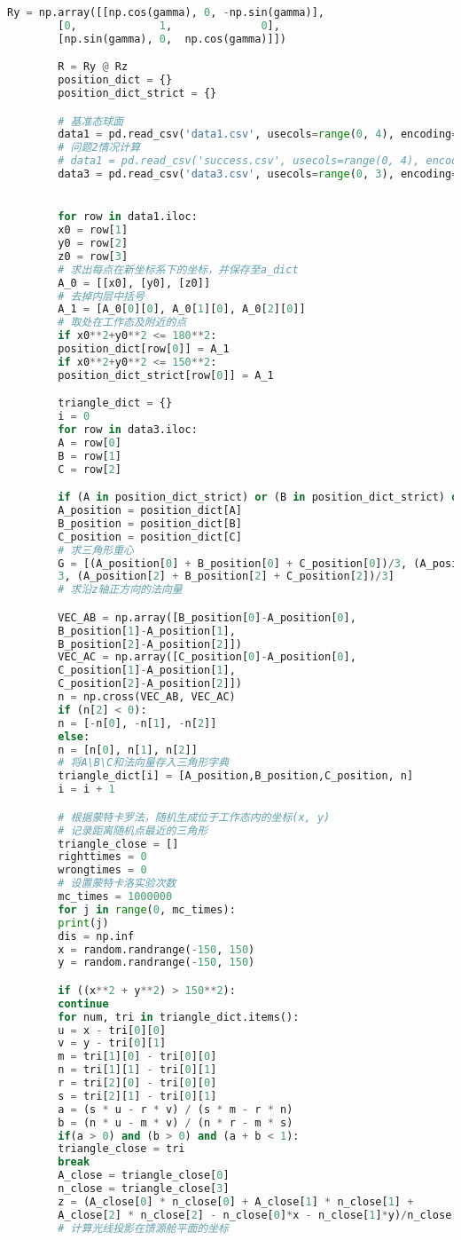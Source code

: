 \documentclass{myclass}
\begin{document}
\begin{appendices}
\begin{lstlisting}[language={python}]
		Ry = np.array([[np.cos(gamma), 0, -np.sin(gamma)],
		[0,             1,              0],
		[np.sin(gamma), 0,  np.cos(gamma)]])

		R = Ry @ Rz
		position_dict = {}
		position_dict_strict = {}

		# 基准态球面
		data1 = pd.read_csv('data1.csv', usecols=range(0, 4), encoding="gbk")
		# 问题2情况计算
		# data1 = pd.read_csv('success.csv', usecols=range(0, 4), encoding="gbk")
		data3 = pd.read_csv('data3.csv', usecols=range(0, 3), encoding="gbk")


		for row in data1.iloc:
		x0 = row[1]
		y0 = row[2]
		z0 = row[3]
		# 求出每点在新坐标系下的坐标，并保存至a_dict
		A_0 = [[x0], [y0], [z0]]
		# 去掉内层中括号
		A_1 = [A_0[0][0], A_0[1][0], A_0[2][0]]
		# 取处在工作态及附近的点
		if x0**2+y0**2 <= 180**2:
		position_dict[row[0]] = A_1
		if x0**2+y0**2 <= 150**2:
		position_dict_strict[row[0]] = A_1

		triangle_dict = {}
		i = 0
		for row in data3.iloc:
		A = row[0]
		B = row[1]
		C = row[2]

		if (A in position_dict_strict) or (B in position_dict_strict) or (C in position_dict_strict):
		A_position = position_dict[A]
		B_position = position_dict[B]
		C_position = position_dict[C]
		# 求三角形重心
		G = [(A_position[0] + B_position[0] + C_position[0])/3, (A_position[1] + B_position[1] + C_position[1]) /
		3, (A_position[2] + B_position[2] + C_position[2])/3]
		# 求沿z轴正方向的法向量

		VEC_AB = np.array([B_position[0]-A_position[0],
		B_position[1]-A_position[1],
		B_position[2]-A_position[2]])
		VEC_AC = np.array([C_position[0]-A_position[0],
		C_position[1]-A_position[1],
		C_position[2]-A_position[2]])
		n = np.cross(VEC_AB, VEC_AC)
		if (n[2] < 0):
		n = [-n[0], -n[1], -n[2]]
		else:
		n = [n[0], n[1], n[2]]
		# 将A\B\C和法向量存入三角形字典
		triangle_dict[i] = [A_position,B_position,C_position, n]
		i = i + 1

		# 根据蒙特卡罗法，随机生成位于工作态内的坐标(x, y)
		# 记录距离随机点最近的三角形
		triangle_close = []
		righttimes = 0
		wrongtimes = 0
		# 设置蒙特卡洛实验次数
		mc_times = 1000000
		for j in range(0, mc_times):
		print(j)
		dis = np.inf
		x = random.randrange(-150, 150)
		y = random.randrange(-150, 150)

		if ((x**2 + y**2) > 150**2):
		continue
		for num, tri in triangle_dict.items():
		u = x - tri[0][0]
		v = y - tri[0][1]
		m = tri[1][0] - tri[0][0]
		n = tri[1][1] - tri[0][1]
		r = tri[2][0] - tri[0][0]
		s = tri[2][1] - tri[0][1]
		a = (s * u - r * v) / (s * m - r * n)
		b = (n * u - m * v) / (n * r - m * s)
		if(a > 0) and (b > 0) and (a + b < 1):
		triangle_close = tri
		break
		A_close = triangle_close[0]
		n_close = triangle_close[3]
		z = (A_close[0] * n_close[0] + A_close[1] * n_close[1] +
		A_close[2] * n_close[2] - n_close[0]*x - n_close[1]*y)/n_close[2]
		# 计算光线投影在馈源舱平面的坐标


\end{lstlisting}
\end{appendices}
\end{document}
